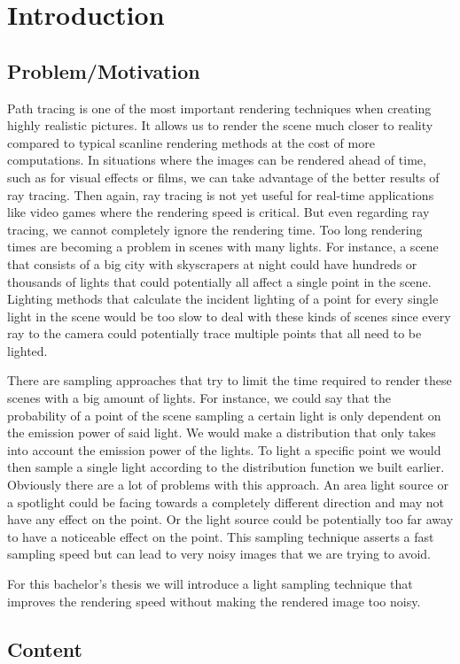 
\chapter{Introduction}
\label{ch:Introduction}

\section{Problem/Motivation}
\label{sec:Introduction:Motivation}

Path tracing is one of the most important rendering techniques when creating highly realistic pictures. It allows us to render the scene much closer to reality compared to typical scanline rendering methods at the cost of more computations. In situations where the images can be rendered ahead of time, such as for visual effects or films, we can take advantage of the better results of ray tracing. Then again, ray tracing is not yet useful for real-time applications like video games where the rendering speed is critical. But even regarding ray tracing, we cannot completely ignore the rendering time. Too long rendering times are becoming a problem in scenes with many lights. For instance, a scene that consists of a big city with skyscrapers at night could have hundreds or thousands of lights that could potentially all affect a single point in the scene. Lighting methods that calculate the incident lighting of a point for every single light in the scene would be too slow to deal with these kinds of scenes since every ray to the camera could potentially trace multiple points that all need to be lighted.

There are sampling approaches that try to limit the time required to render these scenes with a big amount of lights. For instance, we could say that the probability of a point of the scene sampling a certain light is only dependent on the emission power of said light. We would make a distribution that only takes into account the emission power of the lights. To light a specific point we would then sample a single light according to the distribution function we built earlier. Obviously there are a lot of problems with this approach. An area light source or a spotlight could be facing towards a completely different direction and may not have any effect on the point. Or the light source could be potentially too far away to have a noticeable effect on the point. This sampling technique asserts a fast sampling speed but can lead to very noisy images that we are trying to avoid.

For this bachelor's thesis we will introduce a light sampling technique that improves the rendering speed without making the rendered image too noisy.

\section{Content}
\label{sec:Introduction:Content}